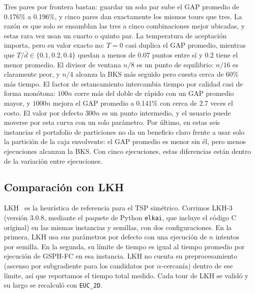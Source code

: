\documentclass[runningheads]{llncs}
\begin{document}
Tres pares por frontera bastan: guardar un solo par sube el GAP promedio
de 0.176\% a 0.196\%, y cinco pares dan exactamente los mismos tours que
tres. La razón es que solo se ensamblan las tres a cinco combinaciones
mejor ubicadas, y estas rara vez usan un cuarto o quinto par. La
temperatura de aceptación importa, pero su valor exacto no: $T=0$ casi
duplica el GAP promedio, mientras que $T/\bar d\in\{0.1,0.2,0.4\}$
quedan a menos de 0.07 puntos entre sí y $0.2$ tiene el menor promedio.
El divisor de ventana $n/8$ es un punto de equilibrio: $n/16$ es
claramente peor, y $n/4$ alcanza la BKS más seguido pero cuesta cerca de
60\% más tiempo. El factor de estancamiento intercambia tiempo por
calidad casi de forma monótona: $100n$ corre más del doble de rápido con
un GAP promedio mayor, y $1000n$ mejora el GAP promedio a 0.141\% con
cerca de 2.7 veces el costo. El valor por defecto $300n$ es un punto
intermedio, y el usuario puede moverse por esta curva con un solo
parámetro. Por último, en estas seis instancias el portafolio de
particiones no da un beneficio claro frente a usar solo la partición de
la caja envolvente: el GAP promedio es menor sin él, pero menos
ejecuciones alcanzan la BKS. Con cinco ejecuciones, estas diferencias
están dentro de la variación entre ejecuciones.

\subsection{Comparación con LKH}
\label{sec:lkh}

LKH~\cite{helsgaun2000effective,helsgaun2017extension} es la heurística
de referencia para el TSP simétrico. Corrimos LKH-3 (versión 3.0.8,
mediante el paquete de Python \texttt{elkai}, que incluye el código C
original) en las mismas instancias y semillas, con dos configuraciones.
En la primera, LKH usa sus parámetros por defecto con una ejecución de
$n$ intentos por semilla. En la segunda, su límite de tiempo es igual al
tiempo promedio por ejecución de GSPH-FC en esa instancia. LKH no cuenta
su preprocesamiento (ascenso por subgradiente para los candidatos por
$\alpha$-cercanía) dentro de ese límite, así que reportamos el tiempo
total medido. Cada tour de LKH se validó y su largo se recalculó con
\texttt{EUC\_2D}.
\end{document}
